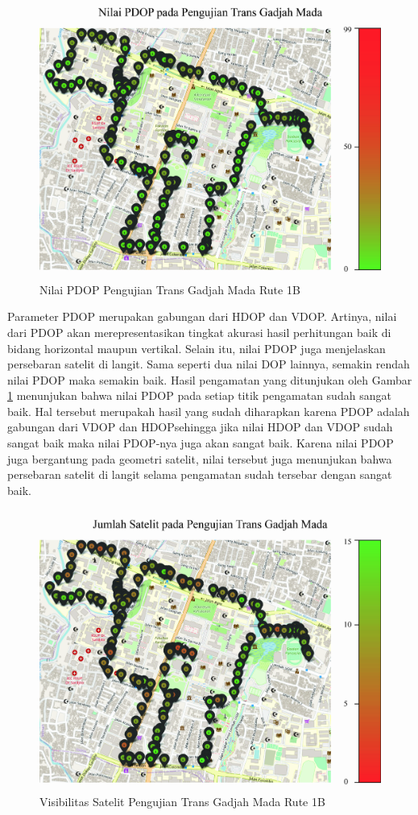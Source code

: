 \begin{figure}[H]
	\centering
	\includegraphics[width=12cm]{contents/chapter-4/pengujian-bergerak/moving-PDOP.jpg}
	\caption{Nilai PDOP Pengujian Trans Gadjah Mada Rute 1B}
	\label{Fig: moving-pdop}
\end{figure}

Parameter PDOP merupakan gabungan dari HDOP dan VDOP. Artinya, nilai dari PDOP akan merepresentasikan tingkat akurasi hasil perhitungan baik di bidang horizontal maupun vertikal. Selain itu, nilai PDOP juga menjelaskan persebaran satelit di langit. Sama seperti dua nilai DOP lainnya, semakin rendah nilai PDOP maka semakin baik. Hasil pengamatan yang ditunjukan oleh Gambar \ref{Fig: moving-pdop} menunjukan bahwa nilai PDOP pada setiap titik pengamatan sudah sangat baik. Hal tersebut merupakah hasil yang sudah diharapkan karena PDOP adalah gabungan dari VDOP dan HDOPsehingga jika nilai HDOP dan VDOP sudah sangat baik maka nilai PDOP-nya juga akan sangat baik. Karena nilai PDOP juga bergantung pada geometri satelit, nilai tersebut juga menunjukan bahwa persebaran satelit di langit selama pengamatan sudah tersebar dengan sangat baik. 

\begin{figure}[H]
	\centering
	\includegraphics[width=12cm]{contents/chapter-4/pengujian-bergerak/moving-SATS.jpg}
	\caption{Visibilitas Satelit Pengujian Trans Gadjah Mada Rute 1B}
	\label{Fig: moving-sats}
\end{figure}

